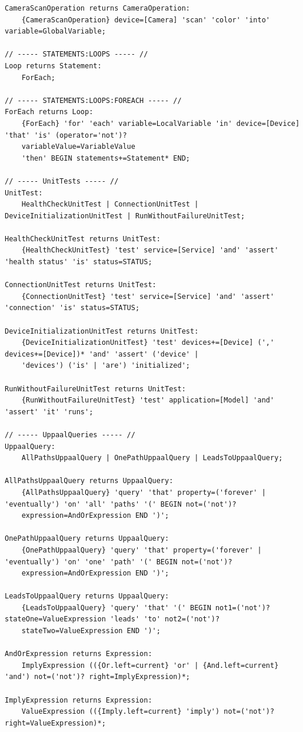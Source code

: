 \begin{verbatim}
CameraScanOperation returns CameraOperation:
	{CameraScanOperation} device=[Camera] 'scan' 'color' 'into' variable=GlobalVariable;

// ----- STATEMENTS:LOOPS ----- //
Loop returns Statement:
	ForEach;

// ----- STATEMENTS:LOOPS:FOREACH ----- //
ForEach returns Loop:
	{ForEach} 'for' 'each' variable=LocalVariable 'in' device=[Device] 'that' 'is' (operator='not')?
	variableValue=VariableValue
	'then' BEGIN statements+=Statement* END;

// ----- UnitTests ----- //
UnitTest:
	HealthCheckUnitTest | ConnectionUnitTest | DeviceInitializationUnitTest | RunWithoutFailureUnitTest;

HealthCheckUnitTest returns UnitTest:
	{HealthCheckUnitTest} 'test' service=[Service] 'and' 'assert' 'health status' 'is' status=STATUS;

ConnectionUnitTest returns UnitTest:
	{ConnectionUnitTest} 'test' service=[Service] 'and' 'assert' 'connection' 'is' status=STATUS;

DeviceInitializationUnitTest returns UnitTest:
	{DeviceInitializationUnitTest} 'test' devices+=[Device] (',' devices+=[Device])* 'and' 'assert' ('device' |
	'devices') ('is' | 'are') 'initialized';

RunWithoutFailureUnitTest returns UnitTest:
	{RunWithoutFailureUnitTest} 'test' application=[Model] 'and' 'assert' 'it' 'runs';

// ----- UppaalQueries ----- //
UppaalQuery:
	AllPathsUppaalQuery | OnePathUppaalQuery | LeadsToUppaalQuery;

AllPathsUppaalQuery returns UppaalQuery:
	{AllPathsUppaalQuery} 'query' 'that' property=('forever' | 'eventually') 'on' 'all' 'paths' '(' BEGIN not=('not')?
	expression=AndOrExpression END ')';

OnePathUppaalQuery returns UppaalQuery:
	{OnePathUppaalQuery} 'query' 'that' property=('forever' | 'eventually') 'on' 'one' 'path' '(' BEGIN not=('not')?
	expression=AndOrExpression END ')';

LeadsToUppaalQuery returns UppaalQuery:
	{LeadsToUppaalQuery} 'query' 'that' '(' BEGIN not1=('not')? stateOne=ValueExpression 'leads' 'to' not2=('not')?
	stateTwo=ValueExpression END ')';

AndOrExpression returns Expression:
	ImplyExpression (({Or.left=current} 'or' | {And.left=current} 'and') not=('not')? right=ImplyExpression)*;

ImplyExpression returns Expression:
	ValueExpression (({Imply.left=current} 'imply') not=('not')? right=ValueExpression)*;


\end{verbatim}
